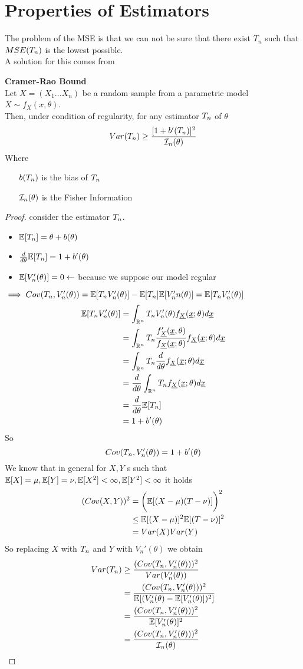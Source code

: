 \section{Properties of Estimators}
The problem of the MSE is that we can not be sure that there exist $T_n$ such that $MSE (T_{n})$ is the lowest possible.\\
A solution for this comes from
\begin{teo}\label{teo:Cramer-Rao Bound}
	\textbf{Cramer-Rao Bound}\\
			Let $X=(X_1... X_n)$ be a random sample from a parametric model $X\sim f_X(x,\theta)$.\\
			Then, under condition of regularity, for any estimator $T_{n}$ of $\theta$ 
			\[
			Var(T_{n})\geq \frac{[1+b'(T_{n})]^2}{\mathcal{I}_n(\theta)}
			\]
Where
\begin{itemize}
	\item[$b(T_{n})$] is the bias of $T_{n}$
	\item[$\mathcal{I}_n(\theta)$] is the Fisher Information
\end{itemize}
\end{teo}
\begin{proof}
	consider the estimator $T_{n}$.
	\begin{itemize}
		\item $\mathbb{E}[T_{n}]=\theta +b(\theta)$
		\item $\frac{d}{d\theta} \mathbb{E}[T_{n}]=1+b'(\theta)$
		\item $\mathbb{E}[V_n'(\theta)]=0 \leftarrow$ because we suppose our model regular
	\end{itemize}
$\implies Cov(T_{n}, V_n'(\theta))=\mathbb{E}[T_{n} V_n'(\theta)] - \mathbb{E}[T_{n}]\mathbb{E}[V_n'n(\theta)]=\mathbb{E}[T_{n} V_n'(\theta)]$ 
\[
\begin{split}
\mathbb{E}[T_{n} V_n'(\theta)]&
=\int_{\mathbb{R}^n}T_{n} V_n'(\theta) f_{\underline X}(\underline{x};\theta) d\underline x\\
&=\int_{\mathbb{R}^n}T_{n} \frac{f_{\underline X}'(\underline x,\theta)}{f_{\underline X}(\underline{x};\theta)}f_{\underline X}(\underline{x};\theta) d\underline x\\
&=\int_{\mathbb{R}^n}T_{n} \frac{d}{d\theta} f_{\underline X}(\underline{x};\theta) d\underline x\\
&=\frac{d}{d\theta} \int_{\mathbb{R}^n}T_{n} f_{\underline X}(\underline{x};\theta) d\underline x\\
&=\frac{d}{d\theta} \mathbb{E}[T_{n}]\\
&=1+b'(\theta)
\end{split}
\]
So
\[
Cov(T_{n},V_n'(\theta))=1+b'(\theta)
\]
We know that in general for $X,Y$ \rv s such that $\mathbb{E}[X]=\mu, \mathbb{E}[Y]=\nu, \mathbb{E}[X^2]<\infty, \mathbb{E}[Y^2]<\infty$ it holds
\[
\begin{split}
(Cov(X,Y))^2&=\bigg( \mathbb{E}[(X-\mu)(T-\nu)] \bigg)^2\\
&\leq  \mathbb{E}[(X-\mu)]^2 \mathbb{E}[(T-\nu)]^2\\
&= Var(X)Var(Y)
\end{split}
\]
So replacing $X$ with $T_{n}$ and $Y$ with $V_n'(\theta)$ we  obtain
\[
\begin{split}
Var(T_{n})&\geq \frac{(Cov(T_{n},V_n'(\theta)))^2}{Var(V_n'(\theta))}\\
&=\frac{(Cov(T_{n},V_n'(\theta)))^2}{\mathbb{E}[(V_n'(\theta)-\mathbb{E}[V_n'(\theta)])^2]}\\
&=\frac{(Cov(T_{n},V_n'(\theta)))^2}{\mathbb{E}[V_n'(\theta)]^2}\\
&=\frac{(Cov(T_{n},V_n'(\theta)))^2}{\mathcal{I}_n(\theta)}
\end{split}
\]
\end{proof}
